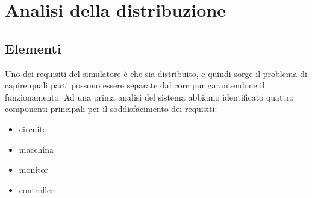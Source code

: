 \chapter{Analisi della distribuzione} %

\label{Chapter5} %



\section{Elementi}

Uno dei requisiti del simulatore è che sia distribuito, e quindi sorge il problema di capire quali parti possono essere separate dal core pur garantendone il funzionamento.
Ad una prima analisi del sistema abbiamo identificato quattro componenti principali per il soddisfacimento dei requisiti:
\begin{itemize}
 \item circuito
 \item macchina
 \item monitor
 \item controller
\end{itemize}

